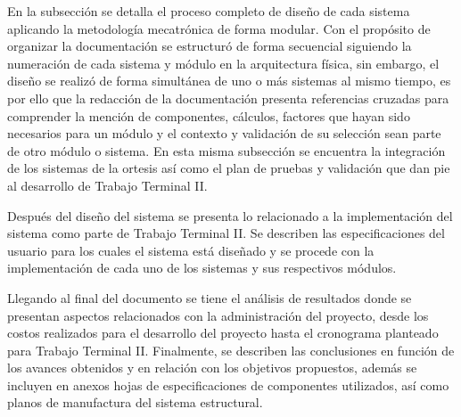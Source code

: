 En la subsección  se detalla el proceso completo de diseño de cada sistema aplicando la metodología mecatrónica de forma modular. Con el propósito de organizar la documentación se estructuró de forma secuencial siguiendo la numeración de cada sistema y módulo en la arquitectura física, sin embargo, el diseño se realizó de forma simultánea de uno o más sistemas al mismo tiempo, es por ello que la redacción de la documentación presenta referencias cruzadas para comprender la mención de componentes, cálculos, factores que hayan sido necesarios para un módulo y el contexto y validación de su selección sean parte de otro módulo o sistema. En esta misma subsección se encuentra la integración de los sistemas de la ortesis así como el plan de pruebas y validación que dan pie al desarrollo de Trabajo Terminal II.

Después del diseño del sistema se presenta lo relacionado a la implementación del sistema como parte de Trabajo Terminal II. Se describen las especificaciones del usuario para los cuales el sistema está diseñado y se procede con la implementación de cada uno de los sistemas y sus respectivos módulos. 

Llegando al final del documento se tiene el análisis de resultados donde se presentan aspectos relacionados con la administración del proyecto, desde los costos realizados para el desarrollo del proyecto hasta el cronograma planteado para Trabajo Terminal II. Finalmente, se describen las conclusiones en función de los avances obtenidos y en relación con los objetivos propuestos, además se incluyen en anexos hojas de especificaciones de componentes utilizados, así como planos de manufactura del sistema estructural.
\endinput 